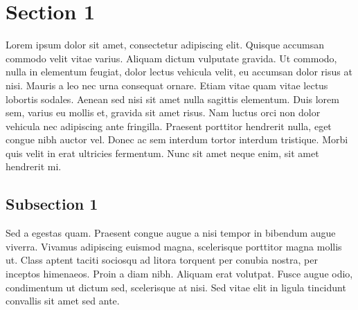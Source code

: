 
\section{Section 1}

Lorem ipsum dolor sit amet, consectetur adipiscing elit. Quisque accumsan commodo velit vitae varius. Aliquam dictum
vulputate gravida. Ut commodo, nulla in elementum feugiat, dolor lectus vehicula velit, eu accumsan dolor risus at nisi.
Mauris a leo nec urna consequat ornare. Etiam vitae quam vitae lectus lobortis sodales. Aenean sed nisi sit amet nulla
sagittis elementum. Duis lorem sem, varius eu mollis et, gravida sit amet risus. Nam luctus orci non dolor vehicula nec
adipiscing ante fringilla. Praesent porttitor hendrerit nulla, eget congue nibh auctor vel. Donec ac sem interdum tortor
interdum tristique. Morbi quis velit in erat ultricies fermentum. Nunc sit amet neque enim, sit amet hendrerit mi.

\subsection{Subsection 1}

Sed a egestas quam. Praesent congue augue a nisi tempor in bibendum augue viverra. Vivamus adipiscing euismod magna,
scelerisque porttitor magna mollis ut. Class aptent taciti sociosqu ad litora torquent per conubia nostra, per inceptos
himenaeos. Proin a diam nibh. Aliquam erat volutpat. Fusce augue odio, condimentum ut dictum sed, scelerisque at nisi.
Sed vitae elit in ligula tincidunt convallis sit amet sed ante.

